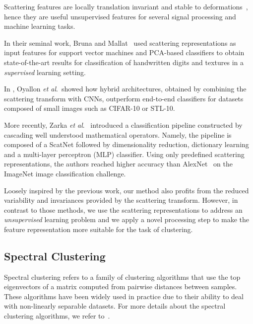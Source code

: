 \documentclass[11pt]{article}
\theoremstyle{definition}
\newcommand{\EtAl}{\textit{et al}}
\begin{document}
Scattering features are locally translation invariant and stable to deformations~\cite{Anden_DeepScatteringSpectrum_2014}, hence they are useful unsupervised features for several signal processing and machine learning tasks. 

In their seminal work, Bruna and Mallat~\cite{Bruna_InvariantScattering_2012} used scattering representations as input features for support vector machines and PCA-based classifiers to obtain state-of-the-art results for classification of handwritten digits and textures in a \emph{supervised} learning setting.  

In \cite{Oyallon_ScatteringHybridNetworks_2018}, Oyallon \EtAl.~showed how hybrid architectures, obtained by combining the scattering transform with CNNs, outperform end-to-end classifiers for datasets composed of small images such as CIFAR-10 or STL-10.

More recently, Zarka \EtAl.~\cite{Zarka_ScatteringHomotopyDictionaryLearningClassification_2019} introduced a classification pipeline constructed by cascading well understood mathematical operators. Namely, the pipeline is composed of a ScatNet followed by dimensionality reduction, dictionary learning and a multi-layer perceptron (MLP) classifier. Using only predefined scattering representations, the authors reached higher accuracy than AlexNet~\cite{Krizhevsky_Alexnet_2012} on the ImageNet image classification challenge. 

Loosely inspired by the previous work, our method also profits from the reduced variability and invariances provided by the scattering transform. However, in contrast to those methods, we use the scattering representations to address an \emph{unsupervised} learning problem and we apply a novel processing step to make the feature representation more suitable for the task of clustering.




\subsection{Spectral Clustering}\label{sec:spectral clustering}

Spectral clustering \cite{Ng_SpectralClustering_2002, Luxburg_SpectralClusteringTutorial_2007, Stella_MulticlassSpectralClustering_2003, Zelnik_SelfTuningSpectralClustering_2005} refers to a family of clustering algorithms that use the top eigenvectors of a matrix computed from pairwise distances between samples. These algorithms have been widely used in practice due to their ability to 
deal with non-linearly separable datasets. For more details about the spectral clustering algorithms, we refer to~\cite{Luxburg_SpectralClusteringTutorial_2007}.
\end{document}
